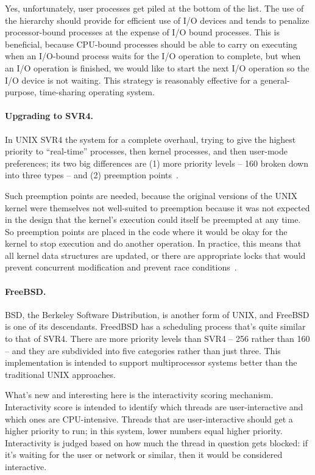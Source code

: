 Yes, unfortunately, user processes get piled at the bottom of the list. The use of the hierarchy should provide for efficient use of I/O devices and tends to penalize processor-bound processes at the expense of I/O bound processes. This is beneficial, because CPU-bound processes should be able to carry on executing when an I/O-bound process waits for the I/O operation to complete, but when an I/O operation is finished, we would like to start the next I/O operation so the I/O device is not waiting. This strategy is reasonably effective for a general-purpose, time-sharing operating system.

\paragraph{Upgrading to SVR4.}
In UNIX SVR4 the system for a complete overhaul, trying to give the highest priority to ``real-time'' processes, then kernel processes, and then user-mode preferences; its two big differences are (1) more priority levels -- 160 broken down into three types -- and (2) preemption points~\cite{osi}. 

Such preemption points are needed, because the original versions of the UNIX kernel were themselves not well-suited to preemption because it was not expected in the design that the kernel's execution could itself be preempted at any time. So preemption points are placed in the code where it would be okay for the kernel to stop execution and do another operation. In practice, this means that all kernel data structures are updated, or there are appropriate locks that would prevent concurrent modification and prevent race conditions~\cite{osi}. 

\paragraph{FreeBSD.}
BSD, the Berkeley Software Distribution, is another form of UNIX, and FreeBSD is one of its descendants. FreedBSD has a scheduling process that's quite similar to that of SVR4. There are more priority levels than SVR4 -- 256 rather than 160 -- and they are subdivided into five categories rather than just three. This implementation is intended to support multiprocessor systems better than the traditional UNIX approaches.

What's new and interesting here is the interactivity scoring mechanism. Interactivity score is intended to identify which threads are user-interactive and which ones are CPU-intensive. Threads that are user-interactive should get a higher priority to run; in this system, lower numbers equal higher priority. Interactivity is judged based on how much the thread in question gets blocked: if it's waiting for the user or network or similar, then it would be considered interactive.


